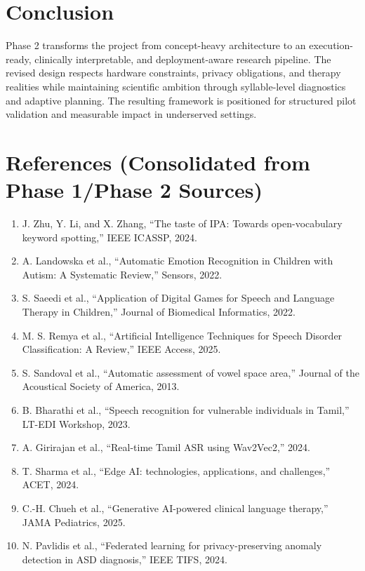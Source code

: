 \documentclass[12pt,a4paper]{article}
\begin{document}
\section{Conclusion}
Phase 2 transforms the project from concept-heavy architecture to an execution-ready, clinically interpretable, and deployment-aware research pipeline. The revised design respects hardware constraints, privacy obligations, and therapy realities while maintaining scientific ambition through syllable-level diagnostics and adaptive planning. The resulting framework is positioned for structured pilot validation and measurable impact in underserved settings.

\section*{References (Consolidated from Phase 1/Phase 2 Sources)}
\begin{enumerate}[leftmargin=6mm,itemsep=2pt,topsep=2pt]
\item J. Zhu, Y. Li, and X. Zhang, ``The taste of IPA: Towards open-vocabulary keyword spotting,'' IEEE ICASSP, 2024.
\item A. Landowska et al., ``Automatic Emotion Recognition in Children with Autism: A Systematic Review,'' Sensors, 2022.
\item S. Saeedi et al., ``Application of Digital Games for Speech and Language Therapy in Children,'' Journal of Biomedical Informatics, 2022.
\item M. S. Remya et al., ``Artificial Intelligence Techniques for Speech Disorder Classification: A Review,'' IEEE Access, 2025.
\item S. Sandoval et al., ``Automatic assessment of vowel space area,'' Journal of the Acoustical Society of America, 2013.
\item B. Bharathi et al., ``Speech recognition for vulnerable individuals in Tamil,'' LT-EDI Workshop, 2023.
\item A. Girirajan et al., ``Real-time Tamil ASR using Wav2Vec2,'' 2024.
\item T. Sharma et al., ``Edge AI: technologies, applications, and challenges,'' ACET, 2024.
\item C.-H. Chueh et al., ``Generative AI-powered clinical language therapy,'' JAMA Pediatrics, 2025.
\item N. Pavlidis et al., ``Federated learning for privacy-preserving anomaly detection in ASD diagnosis,'' IEEE TIFS, 2024.
\end{enumerate}
\end{document}
